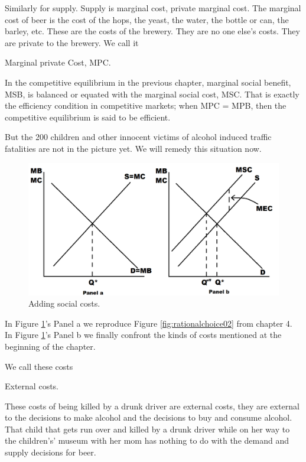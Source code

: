 \documentclass[
]{book}
\begin{document}
Similarly for supply. Supply is marginal cost, private marginal cost. The marginal cost of beer is the cost of the hops, the yeast, the water, the bottle or can, the barley, etc. These are the costs of the brewery. They are no one else's costs. They are private to the brewery. We call it

\begin{center}
Marginal private Cost, MPC.

\end{center}

In the competitive equilibrium in the previous chapter, marginal social benefit, MSB, is balanced or equated with the marginal social cost, MSC. That is exactly the efficiency condition in competitive markets; when MPC = MPB, then the competitive equilibrium is said to be efficient.

But the 200 children and other innocent victims of alcohol induced traffic fatalities are not in the picture yet. We will remedy this situation now.

\begin{figure}

{\centering \includegraphics[width=0.75\linewidth]{img/externalities/extfig1} 

}

\caption{Adding social costs.}\label{fig:extfig1}
\end{figure}

In Figure \ref{fig:extfig1}'s Panel a we reproduce Figure \ref{fig:rationalchoice02} from chapter 4. In Figure \ref{fig:extfig1}'s Panel b we finally confront the kinds of costs mentioned at the beginning of the chapter.

We call these costs

\begin{center}
External costs.

\end{center}

These costs of being killed by a drunk driver are external costs, they are external to the decisions to make alcohol and the decisions to buy and consume alcohol. That child that gets run over and killed by a drunk driver while on her way to the children's' museum with her mom has nothing to do with the demand and supply decisions for beer.
\end{document}
